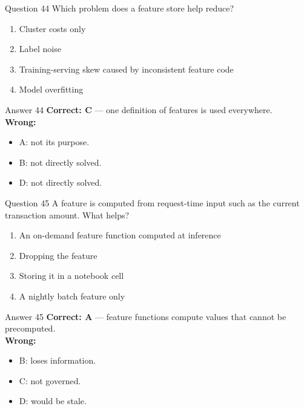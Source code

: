 \documentclass[aspectratio=169,11pt]{beamer}
\begin{document}
\begin{frame}{Question 44}
Which problem does a feature store help reduce?
\begin{enumerate}[label=\Alph*.]
\item Cluster costs only
\item Label noise
\item Training-serving skew caused by inconsistent feature code
\item Model overfitting
\end{enumerate}
\end{frame}
\begin{frame}{Answer 44}
\textbf{Correct: C} --- one definition of features is used everywhere.\\
\vspace{0.5em}
\textbf{Wrong:}
\begin{itemize}
\item A: not its purpose.
\item B: not directly solved.
\item D: not directly solved.
\end{itemize}
\end{frame}

\begin{frame}{Question 45}
A feature is computed from request-time input such as the current transaction amount. What helps?
\begin{enumerate}[label=\Alph*.]
\item An on-demand feature function computed at inference
\item Dropping the feature
\item Storing it in a notebook cell
\item A nightly batch feature only
\end{enumerate}
\end{frame}
\begin{frame}{Answer 45}
\textbf{Correct: A} --- feature functions compute values that cannot be precomputed.\\
\vspace{0.5em}
\textbf{Wrong:}
\begin{itemize}
\item B: loses information.
\item C: not governed.
\item D: would be stale.
\end{itemize}
\end{frame}
\end{document}
